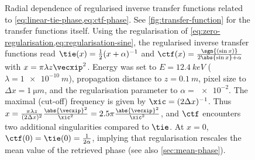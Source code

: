 \documentclass[
twoside,
openright,
titlepage,
numbers=noenddot,
headinclude,
fleqn,
a4paper,
footinclude=true,
cleardoublepage=empty,
abstractoff,
BCOR=5mm,
paper=a4,
fontsize=11pt,
british,ngerman,american,
]{scrreprt}
\begin{document}
\begin{figure} 
  \centering
  \small
  \caption[Fourier space filter (regularised inverse transfer
  function) for standard phase retrieval.]{Radial dependence of
    regularised inverse transfer functions related to
    \cref{eq:linear-tie-phase,eq:ctf-phase}.  See
    \cref{fig:transfer-function} for the transfer functions itself.
    Using the regularisation of
    \cref{eq:zero-regularisation,eq:regularisation-sine}, the
    regularised inverse transfer functions read $\tie(x) =
    \frac12(x+\alpha)^{-1}$ and $\ctf(x) = \frac{\sgn{(\sin
        x)}}{2\abs{\sin x}+\alpha}$ with $x=\pi\lambda z\vecxip^2$.
    Energy was set to $E=\SI{12.4}{keV}$ ($\lambda=\SI{1e-10}{m}$),
    propagation distance to $z=\SI{0.1}{m}$, pixel size to $\Delta x =
    \SI{1}{\micro m}$, and the regularisation parameter to
    $\alpha=\num{e-2}$.  The maximal (cut-off) frequency is given by
    $\xic=(2\Delta x)^{-1}$.  Thus $x=\frac{\pi\lambda z}{(2\Delta
      x)^2}\frac{\abs{\vecxip}^2}{\xic^2} =
    2.5\pi\frac{\abs{\vecxip}^2}{\xic^2}$, and $\ctf$ encounters two
    additional singularities compared to $\tie$.  At $x=0$,
    $\ctf(0)=\tie(0)=\frac{1}{2\alpha}$, implying that regularisation
    rescales the mean value of the retrieved phase (see also
    \cref{sec:mean-phase}).}
  \label{fig:phase-filter}
\end{figure}
\end{document}
